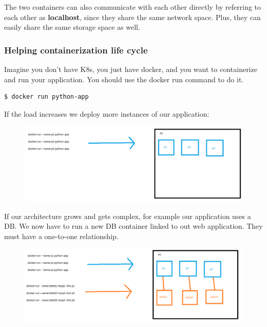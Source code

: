 \documentclass{article}
\newenvironment{blocktemplateII}[1]{%
    \tcolorbox[beamer,%
    noparskip,breakable,
    colframe=Green,%
    colbacklower=LimeGreen!75!LightGreen,%
    title=#1]}%
    {\endtcolorbox}
\newenvironment{codetemplate}[1][]{%
  \mybasecolorbox[#1]
  \itshape
}{%
  \endmybasecolorbox
}
\begin{document}
\begin{blocktemplateII}{Note}
The two containers can also communicate with each other directly by referring to each other as \textbf{localhost}, since they share the same network space. Plus, they can easily share the same storage space as well.    
\end{blocktemplateII}

\subsubsection{Helping containerization life cycle}

Imagine you don't have K8s, you just have docker, and you want to containerize and run your application. You should use the docker run command to do it.

\begin{codetemplate}{}
\begin{verbatim}
$ docker run python-app
\end{verbatim}
\end{codetemplate}


If the load increases we deploy more instances of our application:

\begin{figure}[H]
    \centering
    \includegraphics[scale=0.4]{pictures/image4.png}
\end{figure}

If our architecture grows and gets complex, for example our application uses a DB. We now have to run a new DB container linked to out web application. They must have a one-to-one relationship.

\begin{figure}[H]
    \centering
    \includegraphics[scale=0.55]{pictures/image5.png}
\end{figure}
\end{document}
